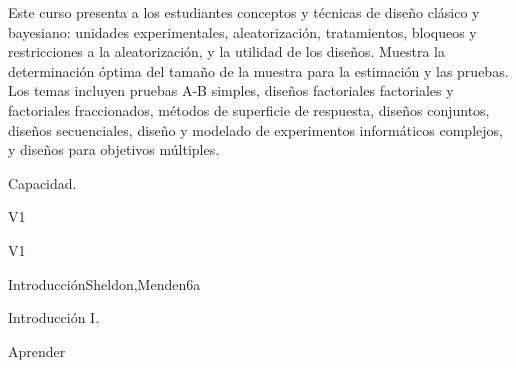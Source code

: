 
\begin{syllabus}


\begin{justification}
Este curso presenta a los estudiantes conceptos y técnicas de diseño clásico y bayesiano: unidades experimentales, aleatorización, tratamientos, bloqueos y restricciones a la aleatorización, y la utilidad de los diseños. Muestra  la determinación óptima del tamaño de la muestra para la estimación y las pruebas. Los temas incluyen pruebas A-B simples, diseños factoriales factoriales y factoriales fraccionados, métodos de superficie de respuesta, diseños conjuntos, diseños secuenciales, diseño y modelado de experimentos informáticos complejos, y diseños para objetivos múltiples. 
\end{justification}

\begin{goals}
\item Capacidad.
\end{goals}

\begin{outcomes}{V1}
   \item {}
\end{outcomes}

\begin{competences}{V1}
    \item {} 
\end{competences}


\begin{unit}{Introducción}{}{Sheldon,Menden}{6}{a}
\begin{topics}
      \item Introducción I.
   \end{topics}

   \begin{learningoutcomes}
      \item Aprender
   \end{learningoutcomes}
\end{unit}





\begin{coursebibliography}
\end{coursebibliography}

\end{syllabus}
